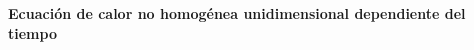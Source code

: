 \begin{center}
	\textbf{
		\textcolor{title}{\titulo \\ \name\\
			Ecuación de calor no homogénea unidimensional dependiente del tiempo}}
\end{center}

